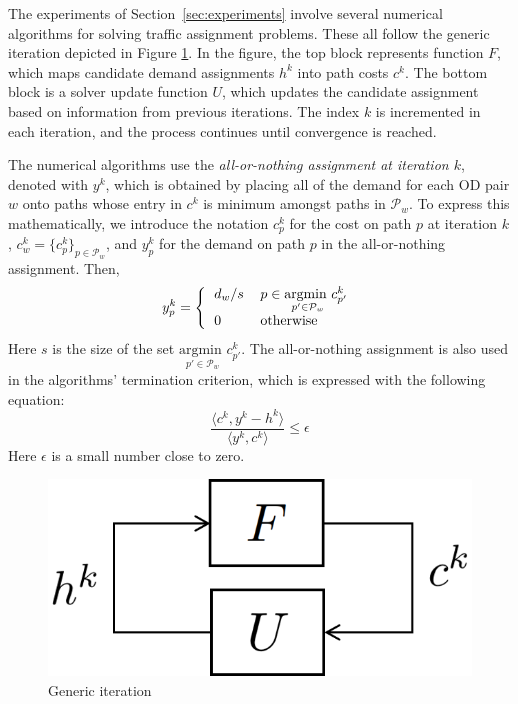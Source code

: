 The experiments of Section~\ref{sec:experiments} involve several numerical algorithms for solving traffic assignment problems. These all follow the generic iteration depicted in Figure \ref{fig:iteartion}. In the figure, the top block represents function $F$, which maps candidate demand assignments $h^k$ into path costs $c^k$. The bottom block is a solver update function $U$, which updates the candidate assignment based on information from previous iterations. The index $k$ is incremented in each iteration, and the process continues until convergence is reached.

The numerical algorithms use the
\textit{all-or-nothing assignment at iteration $k$}, denoted with $y^k$,
which is obtained by placing all of the demand for each OD pair $w$ onto
paths whose entry in $c^k$ is minimum amongst paths in $\mathcal{P}_w$.
To express this mathematically, we introduce the notation $c^k_p$ for the
cost on path $p$ at iteration $k$, $c^k_w=\{c^k_p\}_{p\in\mathcal{P}_w}$,
and $y^k_p$ for the demand on path $p$ in the all-or-nothing assignment. Then,
\begin{equation}
\label{eq:allornothing}
y^k_p = \left\{
\begin{tabular}{ll}
$d_w/s$ & $p\in\underset{p'\in\mathcal{P}_w}{\text{argmin }} c^k_{p'} $ \\
0 & otherwise
\end{tabular}
\right.
\end{equation}
Here $s$ is the size of the set $\underset{p'\in\mathcal{P}_w}{\text{argmin }} c^k_{p'}$. 
The all-or-nothing assignment is also used in the algorithms' termination criterion, which is expressed with the following equation:
\begin{equation}
\label{termination_criterion}
{\frac {\langle c^k,y^k-h^k \rangle} {\langle y^k, c^k\rangle}} \leq \epsilon
\end{equation}
Here $\epsilon$ is a small number close to zero. 

\begin{figure}[h]
    \centering
    \includegraphics[width=0.4\linewidth]{figs/iteration.png}
    \caption{Generic iteration}
    \label{fig:iteartion}
\end{figure}


